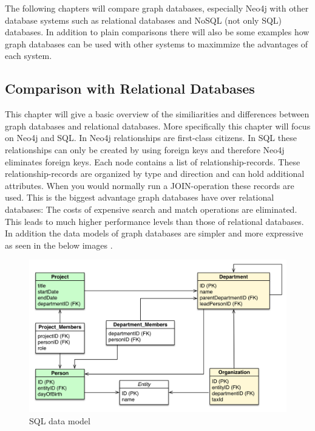 The following chapters will compare graph databases, especially Neo4j with other database systems such as relational databases and NoSQL (not only SQL) databases. In addition to plain comparisons there will also be some examples how graph databases can be used with other systems to maximmize the advantages of each system.

\subsection{Comparison with Relational Databases}

This chapter will give a basic overview of the similiarities and differences between graph databases and relational databases. More specifically this chapter will focus on Neo4j and SQL. 
In Neo4j relationships are first-class citizens. In SQL these relationships can only be created by using foreign keys and therefore Neo4j eliminates foreign keys. Each node contains a list of relationship-records. These relationship-records are organized by type and direction and can hold additional attributes. When you would normally run a JOIN-operation these records are used. This is the biggest advantage graph databases have over relational databases: The costs of expensive search and match operations are eliminated.
This leads to much higher performance levels than those of relational databases.
In addition the data models of graph databases are simpler and more expressive as seen in the below images \cite[pp. 9-10]{HungerBoydLyon.2016}.

\begin{figure}[H]
	\includegraphics[width=\linewidth,keepaspectratio]{images/neo4j/organization_relational.png}
	\caption{SQL data model}
\end{figure}


